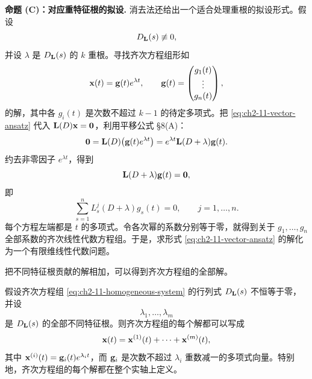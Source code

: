 \medskip
\noindent\textbf{命题 (C)：对应重特征根的拟设.}
消去法还给出一个适合处理重根的拟设形式。假设
\begin{equation}
 D_{\mathbf{L}}(s)\not\equiv0,
 \label{eq:ch2-11-nonzero-determinant}
\end{equation}
并设 \(\lambda\) 是 \(D_{\mathbf{L}}(s)\) 的 \(k\) 重根。寻找齐次方程组形如
\begin{equation}
 \vect{x}(t)=\vect{g}(t)e^{\lambda t},
 \qquad
 \vect{g}(t)=
 \begin{pmatrix}
  g_1(t)\\ \vdots\\ g_n(t)
 \end{pmatrix},
 \label{eq:ch2-11-vector-ansatz}
\end{equation}
的解，其中各 \(g_i(t)\) 是次数不超过 \(k-1\) 的待定多项式。把 \eqref{eq:ch2-11-vector-ansatz} 代入 \(\mat{L}(D)\vect{x}=\vect{0}\)，利用平移公式 §8(A)：
\begin{equation}
 \vect{0}=\mat{L}(D)\bigl(\vect{g}(t)e^{\lambda t}\bigr)
 =e^{\lambda t}\mat{L}(D+\lambda)\vect{g}(t).
 \label{eq:ch2-11-shifted-vector-equation}
\end{equation}
约去非零因子 \(e^{\lambda t}\)，得到
\begin{equation}
 \mat{L}(D+\lambda)\vect{g}(t)=\vect{0},
 \label{eq:ch2-11-shifted-polynomial-condition}
\end{equation}
即
\begin{equation}
 \sum_{s=1}^nL_s^j(D+\lambda)g_s(t)=0,
 \qquad j=1,\ldots,n.
 \label{eq:ch2-11-coordinate-conditions}
\end{equation}
每个方程左端都是 \(t\) 的多项式。令各次幂的系数分别等于零，就得到关于 \(g_1,\ldots,g_n\) 全部系数的齐次线性代数方程组。于是，求形式 \eqref{eq:ch2-11-vector-ansatz} 的解化为一个有限维线性代数问题。

把不同特征根贡献的解相加，可以得到齐次方程组的全部解。

\begin{theorem}[算子方程组的特征分解]
\label{thm:ch2-9-operator-system}
 假设齐次方程组 \eqref{eq:ch2-11-homogeneous-system} 的行列式 \(D_{\mathbf{L}}(s)\) 不恒等于零，并设
 \[
  \lambda_1,\ldots,\lambda_m
 \]
 是 \(D_{\mathbf{L}}(s)\) 的全部不同特征根。则齐次方程组的每个解都可以写成
 \begin{equation}
  \vect{x}(t)=\vect{x}^{(1)}(t)+\cdots+\vect{x}^{(m)}(t),
  \label{eq:ch2-11-sum-root-contributions}
 \end{equation}
 其中 \(\vect{x}^{(i)}(t)=\vect{g}_i(t)e^{\lambda_it}\)，而 \(\vect{g}_i\) 是次数不超过 \(\lambda_i\) 重数减一的多项式向量。特别地，齐次方程组的每个解都在整个实轴上定义。
\end{theorem}

